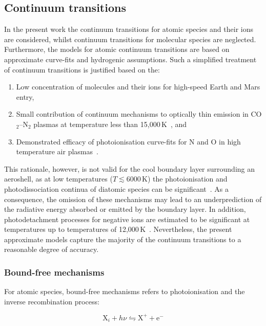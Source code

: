 \subsection{Continuum transitions}

In the present work the continuum transitions for atomic species and their ions are considered, whilst continuum transitions for molecular species are neglected.
Furthermore, the models for atomic continuum transitions are based on approximate curve-fits and hydrogenic assumptions.
Such a simplified treatment of continuum transitions is justified based on the:

\begin{enumerate}
 \item Low concentration of molecules and their ions for high-speed Earth and Mars entry, 
 \item Small contribution of continuum mechanisms to optically thin emission in CO$_2$--N$_2$ plasmas at temperature less than 15,000\,K~\cite{BRP+2009}, and
 \item Demonstrated efficacy of photoionisation curve-fits for N and O in high temperature air plasmas~\cite{JHS2008a}.
\end{enumerate}

This rationale, however, is not valid for the cool boundary layer surrounding an aeroshell, as at low temperatures ($T\lesssim 6000$\,K) the photoionisation and photodissociation continua of diatomic species can be significant~\cite{CDP+2003,BRP+2009}.
As a consequence, the omission of these mechanisms may lead to an underprediction of the radiative energy absorbed or emitted by the boundary layer.
In addition, photodetachment processes for negative ions are estimated to be significant at temperatures up to temperatures of 12,000\,K~\cite{CDP+2003}.
Nevertheless, the present approximate models capture the majority of the continuum transitions to a reasonable degree of accuracy.


\subsubsection{Bound-free mechanisms}

For atomic species, bound-free mechanisms refers to photoionisation and the inverse recombination process:

\begin{equation}
 \text{X}_i + h \nu \leftrightharpoons \text{X}^+ + \text{e}^-
\end{equation}

